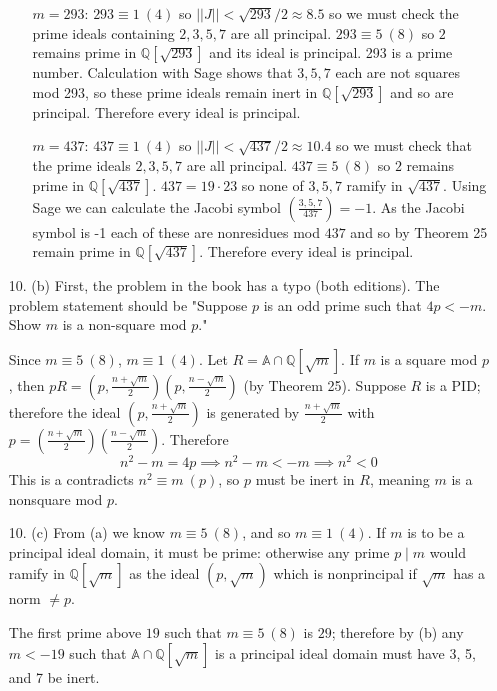\documentclass{article}
\newcommand{\Q}[0]{\mathbb{Q}}
\newcommand{\modequiv}[3]{#1 \equiv #2\ (#3)}
\newcommand{\ringofintegers}[1]{\mathbb{A} \cap #1}
\newcommand{\legendre}[2]{\genfrac{(}{)}{}{}{#1}{#2}}
\begin{document}
\begin{enumerate}
\begin{itemize}
        \item[$m = 293$: ] $\modequiv{293}{1}{4}$ so $||J|| < \sqrt{293} / 2 \approx 8.5$ so we must check the prime ideals containing $2, 3, 5, 7$ are all principal.  $\modequiv{293}{5}{8}$ so $2$ remains prime in $\Q[\sqrt{293}]$ and its ideal is principal.  293 is a prime number.  Calculation with Sage shows that $3, 5, 7$ each are not squares mod 293, so these prime ideals remain inert in $\Q[\sqrt{293}]$ and so are principal.  Therefore every ideal is principal.
        \item[$m = 437$: ] $\modequiv{437}{1}{4}$ so $||J|| < \sqrt{437} / 2 \approx 10.4$ so we must check that the prime ideals $2, 3, 5, 7$ are all principal.  $\modequiv{437}{5}{8}$ so $2$ remains prime in $\Q[\sqrt{437}]$.  $437 = 19 \cdot 23$ so none of $3, 5, 7$ ramify in $\sqrt{437}$.  Using Sage we can calculate the Jacobi symbol $\legendre{3, 5, 7}{437} = -1$.  As the Jacobi symbol is -1 each of these are nonresidues mod $437$ and so by Theorem 25 remain prime in $\Q[\sqrt{437}]$.  Therefore every ideal is principal.
    \end{itemize}

\item[10. (b)] First, the problem in the book has a typo (both editions).  The problem statement should be "Suppose $p$ is an odd prime such that $4p < -m$.  Show $m$ is a non-square mod $p$."

    Since $\modequiv{m}{5}{8}$, $\modequiv{m}{1}{4}$.  Let $R = \ringofintegers{\Q[\sqrt{m}]}$.  If $m$ is a square mod $p$, then $pR = (p, \frac{n +\sqrt{m}}{2})(p, \frac{n - \sqrt{m}}{2})$ (by Theorem 25). Suppose $R$ is a PID; therefore the ideal $(p, \frac{n +\sqrt{m}}{2})$ is generated by $\frac{n + \sqrt{m}}{2}$ with $p = (\frac{n +\sqrt{m}}{2})(\frac{n - \sqrt{m}}{2})$.  Therefore \[ n^2 - m = 4p \implies n^2 - m < -m \implies n^2 < 0 \]
    This is a contradicts $\modequiv{n^2}{m}{p}$, so $p$ must be inert in $R$, meaning $m$ is a nonsquare mod $p$.

\item[10. (c)]
    From (a) we know $\modequiv{m}{5}{8}$, and so $\modequiv{m}{1}{4}$.  If $m$ is to be a principal ideal domain, it must be prime: otherwise any prime $p \mid m$ would ramify in $\Q[\sqrt{m}]$ as the ideal $(p, \sqrt{m})$ which is nonprincipal if $\sqrt{m}$ has a norm $\neq p$.

    The first prime above $19$ such that $\modequiv{m}{5}{8}$ is $29$; therefore by (b) any $m < -19$ such that $\ringofintegers{\Q[\sqrt{m}]}$ is a principal ideal domain must have 3, 5, and 7 be inert.


\end{enumerate}
\end{document}
